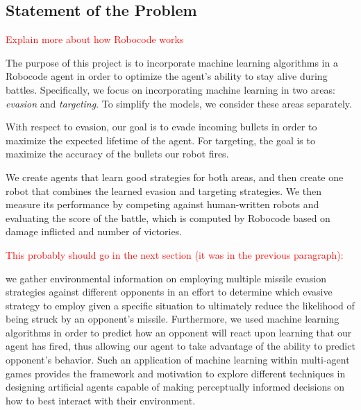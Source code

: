 \documentclass{article}
\newcommand{\xxx}[1]{\textcolor{red}{#1}}
\theoremstyle{plain}
\theoremstyle{definition}
\theoremstyle{remark}
\begin{document}
\subsection*{Statement of the Problem}

\xxx{Explain more about how Robocode works}

The purpose of this project is to incorporate machine learning algorithms in a Robocode agent in order to optimize the agent's ability to stay alive during battles. Specifically, we focus on incorporating machine learning in two areas: \emph{evasion} and \emph{targeting}. To simplify the models, we consider these areas separately.

With respect to evasion, our goal is to evade incoming bullets in order to maximize the expected lifetime of the agent. For targeting, the goal is to maximize the accuracy of the bullets our robot fires.

We create agents that learn good strategies for both areas, and then create one robot that combines the learned evasion and targeting strategies. We then measure its performance by competing against human-written robots and evaluating the score of the battle, which is computed by Robocode based on damage inflicted and number of victories.

\xxx{This probably should go in the next section (it was in the previous paragraph):}

 we gather environmental information on employing multiple missile evasion strategies against different opponents in an effort to determine which evasive strategy to employ given a specific situation to ultimately reduce the likelihood of being struck by an opponent's missile.  Furthermore, we used machine learning algorithms in order to predict how an opponent will react upon learning that our agent has fired, thus allowing our agent to take advantage of the ability to predict opponent's behavior. Such an application of machine learning within multi-agent games provides the framework and motivation to explore different techniques in designing artificial agents capable of making perceptually informed decisions on how to best interact with their environment. 
\end{document}
